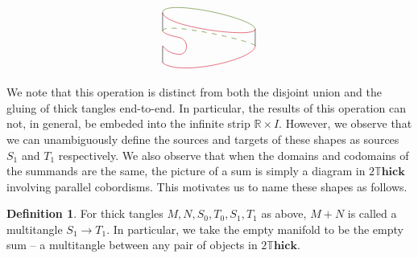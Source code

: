 \documentclass{amsart}
\newcommand{\R}{\mathbb{R}}
\renewcommand{\to}[1][]{\stackrel{#1}{\longrightarrow}}
\newcommand{\DThick}{2\mathbb{T}\mathbf{hick}}
\numberwithin{thm}{section}
\theoremstyle{definition}
\newtheorem{defn}[thm]{Definition}
\begin{document}
\[
\begin{tikzpicture}[x=0.75pt,y=0.75pt,yscale=-1,xscale=1]
\draw [color={rgb, 255:red, 208; green, 2; blue, 27 }  ,draw opacity=1 ]
(10,62.25) .. controls (12.6,66.54) and (25,68.8) .. (30,70) ;
\draw [color={rgb, 255:red, 208; green, 2; blue, 27 }  ,draw opacity=1 ]
(10,80) .. controls (16.2,87.6) and (23,89.6) .. (30,90) ;
\draw [color={rgb, 255:red, 208; green, 2; blue, 27 }  ,draw opacity=1 ]
(30,70) .. controls (41.8,72.8) and (40.6,90) .. (30,90) ;
\draw (10,40.25) -- (10,62.25) ;
\draw (10,80) -- (10,100) ;
\draw [color={rgb, 255:red, 208; green, 2; blue, 27 }  ,draw opacity=1 ]
(10,100) .. controls (30.6,116.7) and (120.2,96) .. (120,80) ;
\draw [color={rgb, 255:red, 65; green, 117; blue, 5 }  ,draw opacity=1 ]
(10,40.25) .. controls (11,23.2) and (119.8,46.8) .. (120,60) ;
\draw [color={rgb, 255:red, 65; green, 117; blue, 5 }  ,draw opacity=1 ]
[dash pattern={on 4.5pt off 4.5pt}]  (10,62.25) .. controls (9.8,50) and
(119.8,74.4) .. (120,80) ;
\draw    (120,60) -- (120,80) ;
\draw [color={rgb, 255:red, 208; green, 2; blue, 27 }  ,draw opacity=1 ]
(10,40.25) .. controls (10.2,57.6) and (120.6,71.6) .. (120,60) ;
\end{tikzpicture}
\]
We note that this operation is distinct from both the disjoint union and the
gluing of thick tangles end-to-end. In particular, the results of this operation
can not, in general, be embeded into the infinite strip $\R \times I$. However,
we observe that we can unambiguously define the sources and targets of these
shapes as sources $S_1$ and $T_1$ respectively. We also observe that when
the domains and codomains of the summands are the same, the picture of a sum is
simply a diagram in $\DThick$ involving parallel cobordisms. This motivates us
to name these shapes as follows.

\begin{defn}
For thick tangles $M, N, S_0, T_0, S_1, T_1$ as above, $M + N$ is called a
multitangle $S_1 \to T_1$. In particular, we take the empty manifold to be
the empty sum -- a multitangle between any pair of objects in $\DThick$.
\end{defn}
\end{document}
